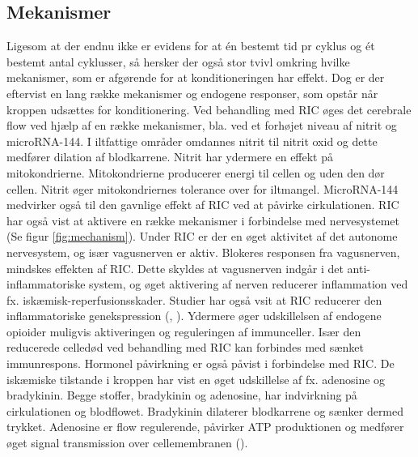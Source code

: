 \subsection{Mekanismer}
Ligesom at der endnu ikke er evidens for at én bestemt tid pr cyklus og ét bestemt antal cyklusser, så hersker der også stor tvivl omkring hvilke mekanismer, som er afgørende for at konditioneringen har effekt.  Dog er der eftervist en lang række mekanismer og endogene responser, som opstår når kroppen udsættes for konditionering. Ved behandling med RIC øges det cerebrale flow ved hjælp af en række mekanismer, bla. ved et forhøjet niveau af nitrit og microRNA-144. I iltfattige områder omdannes nitrit til nitrit oxid og dette medfører dilation af blodkarrene. Nitrit har ydermere en effekt på mitokondrierne. Mitokondrierne producerer energi til cellen og uden den dør cellen. Nitrit øger mitokondriernes tolerance over for iltmangel. MicroRNA-144 medvirker også til den gavnlige effekt af RIC ved at påvirke cirkulationen.
RIC har også vist at aktivere en række mekanismer i forbindelse med nervesystemet (Se figur \ref{fig:mechanism}). Under RIC er der en øget aktivitet af det autonome nervesystem, og især vagusnerven er aktiv. Blokeres responsen fra vagusnerven, mindskes effekten af RIC. Dette skyldes at vagusnerven indgår i det anti-inflammatoriske system, og øget aktivering af nerven reducerer inflammation ved fx. iskæmisk-reperfusionsskader. Studier har også vsit at RIC reducerer den inflammatoriske genekspression (\cite{RefWorks:20}, \cite{RefWorks:3}). Ydermere  øger udskillelsen af endogene opioider muligvis aktiveringen og reguleringen af immunceller. Især den reducerede celledød ved behandling med RIC kan forbindes med sænket immunrespons. Hormonel påvirkning er også påvist i forbindelse med RIC. De iskæmiske tilstande i kroppen har vist en øget udskillelse af fx. adenosine og bradykinin. Begge stoffer, bradykinin og adenosine, har indvirkning på cirkulationen og blodflowet. Bradykinin dilaterer blodkarrene og sænker dermed trykket. Adenosine er flow regulerende, påvirker ATP produktionen og medfører øget signal transmission over cellemembranen (\cite{RefWorks:3}).

